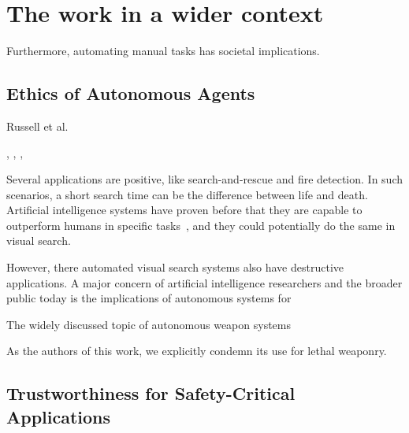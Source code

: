 \section{The work in a wider context}
\label{sec:discussion-wider}

% 

Furthermore, automating manual tasks has societal implications.


\subsection{Ethics of Autonomous Agents}

Russell et al.~\cite{russell_priorities_2015}

\cite{vinuesa_sustainable_2020}, \cite{russell_ethics_2015}, \cite{russell_beneficial_2022}, \cite{brundage_malicious_2018}

Several applications are positive, like search-and-rescue and fire detection.
In such scenarios, a short search time can be the difference between life and death.
Artificial intelligence systems have proven before that they are capable to outperform humans in specific tasks~\cite{silver_alphago_2016,vinyals_alphastar_2019}, and they could potentially do the same in visual search.

However, there automated visual search systems also have destructive applications.
A major concern of artificial intelligence researchers and the broader public today is the implications of autonomous systems for 

The widely discussed topic of autonomous weapon systems


As the authors of this work, we explicitly condemn its use for lethal weaponry.

\subsection{Trustworthiness for Safety-Critical Applications}

